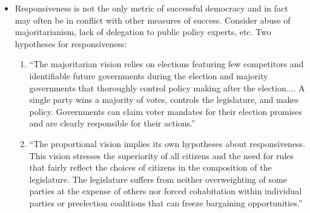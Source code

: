 \documentclass[12pt]{article}
\begin{document}
\begin{itemize}[leftmargin=*, itemsep=4pt]
    \item Responsiveness is not the only metric of successful democracy and in fact may often be in conflict with other measures of success. Consider abuse of majoritarianism, lack of delegation to public policy experts, etc. Two hypotheses for responsiveness:
    \begin{enumerate}
        \item ``The majoritarian vision relies on elections featuring few competitors and identifiable future governments during the election and majority governments that thoroughly control policy making after the election.... A single party wins a majority of votes, controls the legislature, and makes policy. Governments can claim voter mandates for their election promises and are clearly responsible for their actions.''
        \item ``The proportional vision implies its own hypotheses about responsiveness. This vision stresses the superiority of all citizens and the need for rules that fairly reflect the choices of citizens in the composition of the legislature. The legislature suffers from neither overweighting of some parties at the expense of others nor forced cohabitation within individual parties or preelection coalitions that can freeze bargaining opportunities.''
        

\end{enumerate}
\end{itemize}
\end{document}
